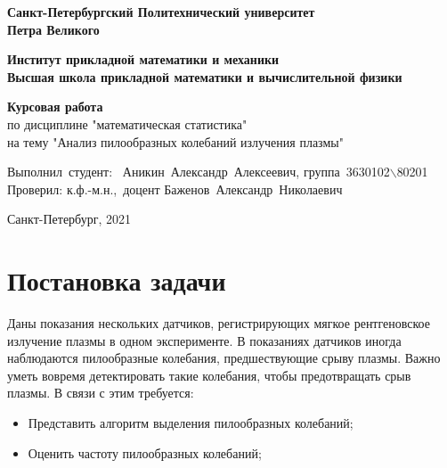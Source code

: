 \documentclass[12pt,a4paper]{article}
\begin{document}
	
	\begin{titlepage}
		
		\begin{center}
			\begin{large}
				\textbf{Санкт-Петербургский Политехнический университет\\ Петра Великого\\}
			\end{large}
			\textbf{Институт прикладной математики и механики}\\
			\vspace{0.2cm}
			\textbf{Высшая школа прикладной математики и вычислительной физики}\\
			
		\end{center}
		
		\vspace{3cm}
		\begin{center}
			\textbf{Курсовая работа}\\
			по дисциплине "математическая статистика" \\
			на тему "Анализ пилообразных колебаний излучения плазмы"
		\end{center}
		
		\vspace{3cm}
		
		\vbox{%
			\hfill%
			\vbox{%
				\hbox{Выполнил студент:}%
				\hbox{\break}
				\hbox{ Аникин Александр Алексеевич,}%
				\hbox{группа 3630102$\backslash$80201}%
				\hbox{\break}
				\hbox{\break}
				\hbox{Проверил:}
				\hbox{\break}
				\hbox{к.ф.-м.н., доцент}
				\hbox{Баженов Александр Николаевич}
			}%
		} 
		\vfill
		
		\begin{center}
			Санкт-Петербург, 2021
		\end{center}
		
	\end{titlepage}

	\tableofcontents
	\newpage
	
	\listoffigures
	\newpage

	\section{Постановка задачи}
	
		Даны показания нескольких датчиков, регистрирующих мягкое рентгеновское излучение плазмы в одном эксперименте. В показаниях датчиков иногда наблюдаются пилообразные колебания, предшествующие срыву плазмы. Важно уметь вовремя детектировать такие колебания, чтобы
		предотвращать срыв плазмы. В связи с этим требуется: 
		\begin{itemize}
			\item Представить алгоритм выделения пилообразных колебаний;
			\item Оценить частоту пилообразных колебаний;
		\end{itemize}
	\newpage
	
\end{document}
